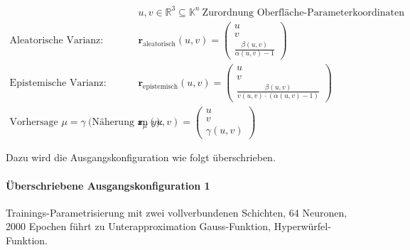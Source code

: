 \begin{otherlanguage}{ngerman}
\begin{small}
\[
\begin{aligned}
&u, v \in \mathbb{R}^{3} \subseteq \mathbb{K}^{n} \ \text{Zurordnung Oberfläche-Parameterkoordinaten} \\[0.5em]
\text{Aleatorische Varianz:} \quad
&\mathbf{r}_{\mathrm{aleatorisch}}(u,v) =
\begin{pmatrix}
u \\
v \\
\displaystyle \frac{\beta(u,v)}{\alpha(u,v) - 1}
\end{pmatrix}
\\[1.0em]
\text{Epistemische Varianz:} \quad
&\mathbf{r}_{\mathrm{epistemisch}}(u,v) =
\begin{pmatrix}
u \\
v \\
\displaystyle \frac{\beta(u,v)}{v(u,v) \cdot (\alpha(u,v) - 1)}
\end{pmatrix}
\\[1.0em]
\text{Vorhersage } \mu = \gamma \ \text{(Näherung an $y$):} \quad
&\mathbf{r}_{\mu}(u,v) =
\begin{pmatrix}
u \\
v \\
\gamma(u,v)
\end{pmatrix}
\end{aligned}
\]
\end{small}


Dazu wird die Ausgangskonfiguration wie folgt überschrieben.

\vspace{0.125\baselineskip}
\noindent

\paragraph{Überschriebene Ausgangskonfiguration 1} Trainings-Parametrisierung mit zwei vollverbundenen Schichten, 64 Neuronen, 2000 Epochen führt zu Unterapproximation Gauss-Funktion, Hyperwürfel-Funktion.







\end{otherlanguage}
